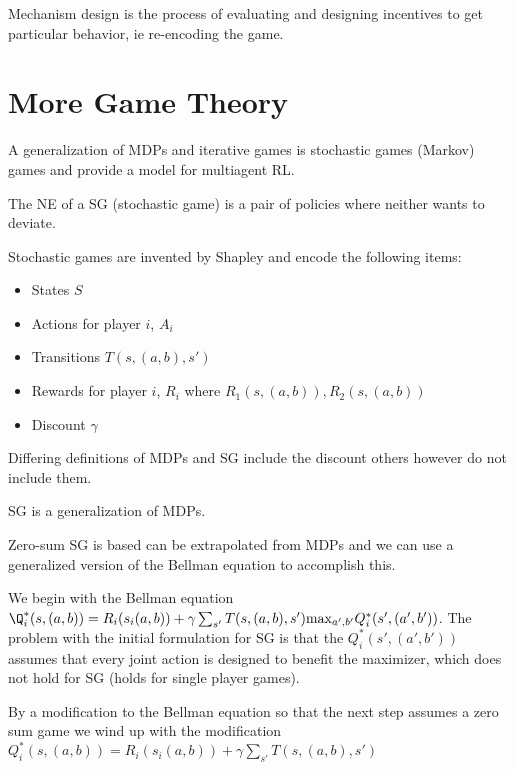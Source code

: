 \documentclass{article}
\begin{document}
Mechanism design is the process of evaluating and designing incentives to
get particular behavior, ie re-encoding the game. 


\section{More Game Theory}

A generalization of MDPs and iterative games is stochastic games (Markov) 
games and provide a model for multiagent RL. 

The NE of a SG (stochastic game) is a pair of policies where neither wants to
deviate. 

Stochastic games are invented by Shapley and encode the following items:
\begin{itemize}
	\item States $S$
	\item Actions for player $i$, $A_i$
	\item Transitions $T(s, (a,b), s')$
	\item Rewards for player $i$, $R_i$ where $R_1(s,(a,b)), R_2(s,(a,b))$
	\item Discount $\gamma$
\end{itemize}

Differing definitions of MDPs and SG include the discount  others however do not
include them. 

SG is a generalization of MDPs. 

Zero-sum SG is based can be extrapolated from MDPs and we can use a generalized
version of the Bellman equation to accomplish this. 

We begin with the Bellman equation $\Q_i^*(s,(a,b)) = R_i(s_i(a,b)) + \gamma
\sum_{s'} T(s,(a,b),s')\text{max}_{a',b'}Q_i^*(s',(a',b'))$. The problem with
the initial formulation for SG is that the $Q^*_i(s',(a',b'))$  assumes that
every joint action is designed to benefit the maximizer, which does not hold for
SG (holds for single player games). 

By a modification to the Bellman equation so that the next step assumes a zero 
sum game we wind up with the modification $Q_i^*(s,(a,b)) = R_i(s_i(a,b)) + 
\gamma\sum_{s'}T(s, (a,b), s')$
		
\end{document}
